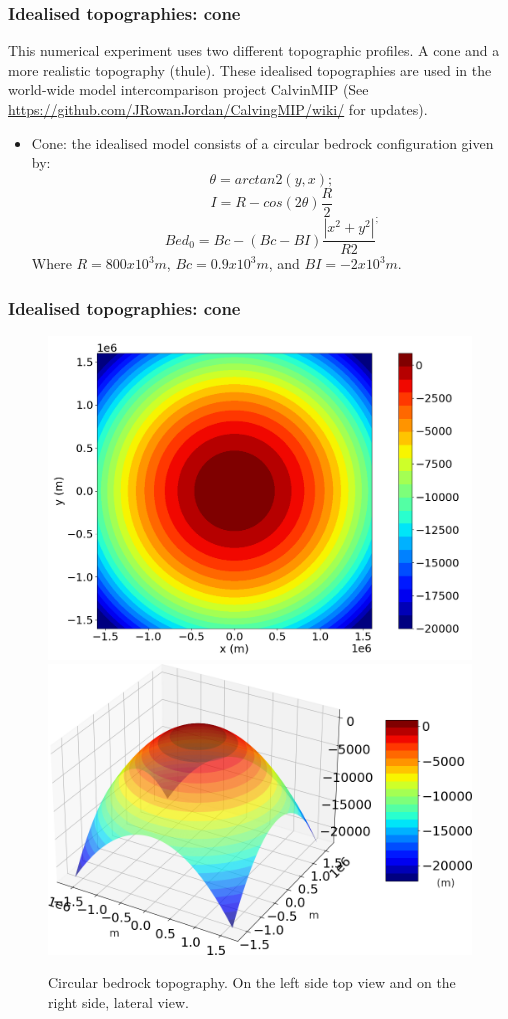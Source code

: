 \documentclass[11pt]{beamer}
\begin{document}
\begin{frame}
	\frametitle{Idealised topographies: cone}
	This numerical experiment uses two different topographic profiles. A cone and a more realistic topography (thule). These idealised topographies are used in the world-wide model intercomparison project CalvinMIP (See \url{https://github.com/JRowanJordan/CalvingMIP/wiki/} for updates).
	\begin{itemize}
	\item Cone: the idealised model consists of a circular bedrock configuration given by:
		\begin{equation}
			\theta=arctan2(y,x);
		\end{equation}
		\begin{equation}
			I=R-cos(2\theta)\frac{R}{2}
		\end{equation}
		\begin{equation}
			Bed_0=Bc-(Bc-BI)\frac{|x^2+y^2|}{R2}^;
		\end{equation}
		Where $R=800x10^3 m$, $Bc=0.9 x 10^3 m$, and $BI=-2 x 10^3 m$. 
	\end{itemize}
\end{frame}
\begin{frame}
	\frametitle{Idealised topographies: cone}
	\begin{center}
			\begin{figure}[!h]
			\centering
			\includegraphics[width=0.45\linewidth]{../fig/circular_topo_top}
			\includegraphics[width=0.45\linewidth]{../fig/circular_topo_jet}
			\caption{Circular bedrock topography. On the left side top view and on the right side, lateral view.}
			\label{circular_topo_top}
		\end{figure}
	\end{center}
\end{frame}
\end{document}
